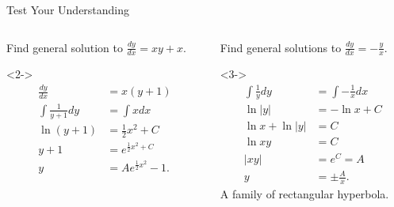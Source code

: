 \documentclass[8pt]{beamer}
\begin{document}
\begin{frame}[shrink]{Test Your Understanding}
	\begin{columns}[T]
		\begin{column}{0.5\textwidth}
	\begin{problem}
	Find general solution to $\frac{dy}{dx}=xy+x$.
	\end{problem}
	\begin{solution}<2->
		\begin{align*}
			\frac{dy}{dx}&=x(y+1) \\
		\int \frac{1}{y+1} dy &= \int x dx \\
		\ln (y+1) &= \frac{1}{2}x^2+C \\
		y+1&=e^{\frac{1}{2}x^2+C} \\
		   y &= Ae^{\frac{1}{2}x^2}-1 
		.\end{align*}
	\end{solution}
\end{column}
\begin{column}{.5\textwidth}
	\begin{problem}
		Find general solutions to $\frac{dy}{dx}=-\frac{y}{x}.$
	\end{problem}
	\begin{solution}<3->
		\begin{align*}
			\int \frac{1}{y}dy&= \int -\frac{1}{x}dx \\
			\ln |y| &= -\ln x +C \\
			\ln x + \ln |y| &= C\\
			\ln xy &= C \\
			|xy| &= e^{C} = A \\
			y &= \pm \frac{A}{x}
		.\end{align*}
		A family of rectangular hyperbola. 
	\end{solution}
\end{column}
\end{columns}
\end{frame}
\end{document}
